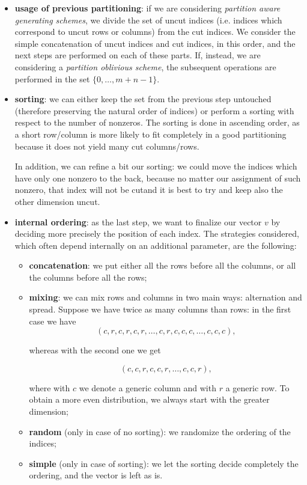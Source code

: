 \begin{itemize}
	\item \textbf{usage of previous partitioning}: if we are considering \emph{partition aware generating schemes}, we divide the set of uncut indices (i.e. indices which correspond to uncut rows or columns) from the  cut indices. We consider the simple concatenation of uncut indices and cut indices, in this order, and the next steps are performed on each of these parts. If, instead, we are considering a \emph{partition oblivious scheme}, the subsequent operations are performed in the set $\{0,\dots,m+n-1\}$.

	\item \textbf{sorting}: we can either keep the set from the previous step untouched (therefore preserving the natural order of indices) or perform a sorting with respect to the number of nonzeros. The sorting is done in ascending order, as a short row/column is more likely to fit completely in a good partitioning because it does not yield many cut columns/rows.

		In addition, we can refine a bit our sorting: we could move the indices which have only one nonzero to the back, because no matter our assignment of such nonzero, that index will not be cutand it is best to try and keep also the other dimension uncut. 

	\item \textbf{internal ordering}: as the last step, we want to finalize our vector $v$ by deciding more precisely the position of each index. The strategies considered, which often depend internally on an additional parameter, are the following:

		\begin{itemize}
			\item \textbf{concatenation}: we put either all the rows before all the columns, or all the columns before all the rows;
			\item \textbf{mixing}: we can mix rows and columns in two main ways: alternation and spread. Suppose we have twice as many columns than rows: in the first case we have 
				$$(c,r,c,r,c,r,\dots,c,r,c,c,c,\dots,c,c,c),$$

				whereas with the second one we get 

				$$(c,c,r,c,c,r,\dots,c,c,r),$$

				where with $c$ we denote a generic column and with $r$ a generic row. To obtain a more even distribution, we always start with the greater dimension;
			\item \textbf{random} (only in case of no sorting): we randomize the ordering of the indices;
			\item \textbf{simple} (only in case of sorting): we let the sorting decide completely the ordering, and the vector is left as is.
		\end{itemize}
\end{itemize}

